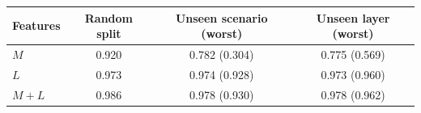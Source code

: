 \begin{tabular}{@{}lccc@{}}
\toprule
Features & Random split & Unseen scenario (worst) & Unseen layer (worst) \\
\midrule
$M$ & 0.920 & 0.782 (0.304) & 0.775 (0.569) \\
$L$ & 0.973 & 0.974 (0.928) & 0.973 (0.960) \\
$M+L$ & 0.986 & 0.978 (0.930) & 0.978 (0.962) \\
\bottomrule
\end{tabular}
